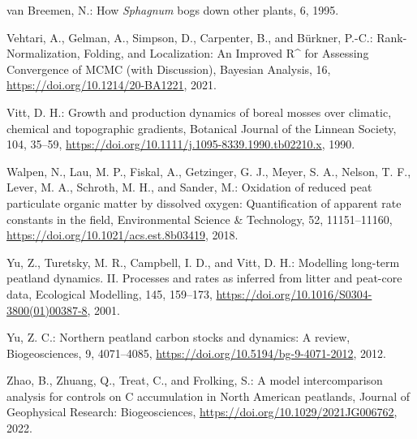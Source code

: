 \documentclass[
  12pt,
]{article}
\newlength{\cslhangindent}
\newlength{\cslentryspacingunit} %
\newenvironment{CSLReferences}[2] %
 {%
  \setlength{\parindent}{0pt}
  \ifodd #1
  \let\oldpar\par
  \def\par{\hangindent=\cslhangindent\oldpar}
  \fi
  \setlength{\parskip}{#2\cslentryspacingunit}
 }%
 {}
\begin{document}
\begin{CSLReferences}{0}{0}
\leavevmode{}%
van Breemen, N.: How {\emph{Sphagnum}} bogs down other plants, 6, 1995.

\leavevmode{}%
Vehtari, A., Gelman, A., Simpson, D., Carpenter, B., and Bürkner, P.-C.: Rank-{Normalization}, {Folding}, and {Localization}: {An Improved R{\^{}}} for {Assessing Convergence} of {MCMC} (with {Discussion}), Bayesian Analysis, 16, \url{https://doi.org/10.1214/20-BA1221}, 2021.

\leavevmode{}%
Vitt, D. H.: Growth and production dynamics of boreal mosses over climatic, chemical and topographic gradients, Botanical Journal of the Linnean Society, 104, 35--59, \url{https://doi.org/10.1111/j.1095-8339.1990.tb02210.x}, 1990.

\leavevmode{}%
Walpen, N., Lau, M. P., Fiskal, A., Getzinger, G. J., Meyer, S. A., Nelson, T. F., Lever, M. A., Schroth, M. H., and Sander, M.: Oxidation of reduced peat particulate organic matter by dissolved oxygen: {Quantification} of apparent rate constants in the field, Environmental Science \& Technology, 52, 11151--11160, \url{https://doi.org/10.1021/acs.est.8b03419}, 2018.

\leavevmode{}%
Yu, Z., Turetsky, M. R., Campbell, I. D., and Vitt, D. H.: Modelling long-term peatland dynamics. {II}. {Processes} and rates as inferred from litter and peat-core data, Ecological Modelling, 145, 159--173, \url{https://doi.org/10.1016/S0304-3800(01)00387-8}, 2001.

\leavevmode{}%
Yu, Z. C.: Northern peatland carbon stocks and dynamics: A review, Biogeosciences, 9, 4071--4085, \url{https://doi.org/10.5194/bg-9-4071-2012}, 2012.

\leavevmode{}%
Zhao, B., Zhuang, Q., Treat, C., and Frolking, S.: A model intercomparison analysis for controls on {C} accumulation in {North American} peatlands, Journal of Geophysical Research: Biogeosciences, \url{https://doi.org/10.1029/2021JG006762}, 2022.

\end{CSLReferences}
\end{document}
